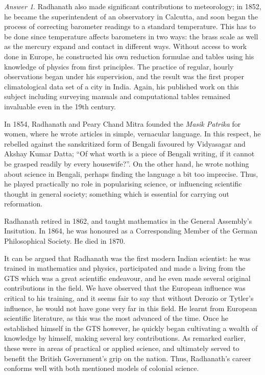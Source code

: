 \documentclass[11pt]{article}
\theoremstyle{remark}
\newtheorem*{answer}{Answer}
\begin{document}
\begin{answer}
        Radhanath also made significant contributions to meteorology; in 1852, he
        became the superintendent of an observatory in Calcutta, and soon began the
        process of correcting barometer readings to a standard temperature. This has
        to be done since temperature affects barometers in two ways: the brass scale
        as well as the mercury expand and contact in different ways. Without access
        to work done in Europe, he constructed his own reduction formulae and tables
        using his knowledge of physics from first principles. The practice of
        regular, hourly observations began under his supervision, and the result was
        the first proper climatological data set of a city in India. Again, his
        published work on this subject including surveying manuals and computational
        tables remained invaluable even in the 19th century.

        In 1854, Radhanath and Peary Chand Mitra founded the \emph{Masik Patrika} for
        women, where he wrote articles in simple, vernacular language. In this
        respect, he rebelled against the sanskritized form of Bengali favoured by
        Vidyasagar and Akshay Kumar Datta; ``Of what worth is a piece of Bengali
        writing, if it cannot be  grasped readily by every housewife?''. On the other
        hand, he wrote nothing about science in Bengali, perhaps finding the language
        a bit too imprecise. Thus, he played practically no role in popularising
        science, or influencing scientific thought in general society; something
        which is essential for carrying out reformation.

        Radhanath retired in 1862, and taught mathematics in the General Assembly's
        Insitution. In 1864, he was honoured as a Corresponding Member of the German
        Philosophical Society. He died in 1870.

        It can be argued that Radhanath was the first modern Indian scientist: he was
        trained in mathematics and physics, participated and made a living from the
        GTS which was a great scientific endeavour, and he even made several original
        contributions in the field. We have observed that the European influence was
        critical to his training, and it seems fair to say that without Derozio or
        Tytler's influence, he would not have gone very far in this field. He learnt
        from European scientific literature, as this was the most advanced of the
        time. Once he established himself in the GTS however, he quickly began
        cultivating a wealth of knowledge by himself, making several key
        contributions. As remarked earlier, these were in areas of practical or
        applied science, and ultimately served to benefit the British Government's
        grip on the nation. Thus, Radhanath's career conforms well with both
        mentioned models of colonial science. \\


\end{answer}
\end{document}

